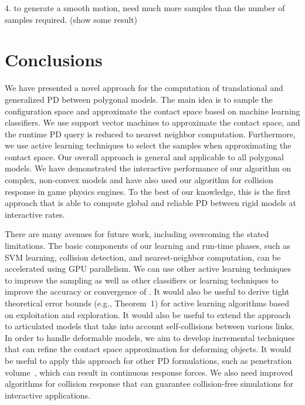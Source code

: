 4. to generate a smooth motion, need much more samples than the number of samples required. (show some result)




\section{Conclusions}
We have presented a novel approach for the computation of translational and generalized PD between polygonal models.
The main idea is to sample the configuration space and approximate the contact space based on
machine learning classifiers. We use support vector machines to approximate the contact space, and
the runtime PD query is reduced to nearest neighbor computation. Furthermore,
we use active learning techniques to select the samples when approximating the contact space.
Our overall approach is general and applicable to all polygonal models.
We have demonstrated the interactive performance of our algorithm on complex, non-convex models and have also used
our algorithm for collision response in game physics engines.
To the best of our knowledge, this is the first approach that is able to compute global and reliable PD between rigid models at
interactive rates.


There are many avenues for future work, including overcoming the stated limitations. The basic components of our learning and run-time phases, such as SVM learning, collision detection, and nearest-neighbor computation, can be accelerated using GPU parallelism. We can use other active learning techniques to improve the sampling as well as other classifiers or learning techniques to improve the accuracy or convergence of \LCS. It would also be useful to derive tight theoretical error bounds (e.g., Theorem~1) for active learning algorithms based on exploitation and exploration.
It would also be useful to extend the approach to articulated models that take into account self-collisions between various links.
In order to handle deformable models, we aim to develop incremental techniques that can refine the contact
space approximation for deforming objects. It would be useful to apply this approach for other PD formulations, such as penetration volume~\cite{Weller-RSS-09}, which can result in continuous response forces. We also need improved algorithms for collision response that can guarantee collision-free simulations for interactive applications.

